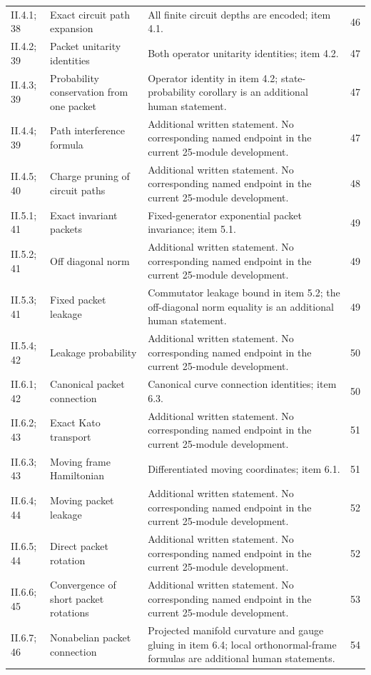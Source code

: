 {\begin{longtable}{@{}p{.13\linewidth}p{.31\linewidth}p{.42\linewidth}r@{}}
II.4.1; 38 & Exact circuit path expansion & All finite circuit depths are encoded; item 4.1. & 46\\
II.4.2; 39 & Packet unitarity identities & Both operator unitarity identities; item 4.2. & 47\\
II.4.3; 39 & Probability conservation from one packet & Operator identity in item 4.2; state-probability corollary is an additional human statement. & 47\\
II.4.4; 39 & Path interference formula & Additional written statement. No corresponding named endpoint in the current 25-module development. & 47\\
II.4.5; 40 & Charge pruning of circuit paths & Additional written statement. No corresponding named endpoint in the current 25-module development. & 48\\
II.5.1; 41 & Exact invariant packets & Fixed-generator exponential packet invariance; item 5.1. & 49\\
II.5.2; 41 & Off diagonal norm & Additional written statement. No corresponding named endpoint in the current 25-module development. & 49\\
II.5.3; 41 & Fixed packet leakage & Commutator leakage bound in item 5.2; the off-diagonal norm equality is an additional human statement. & 49\\
II.5.4; 42 & Leakage probability & Additional written statement. No corresponding named endpoint in the current 25-module development. & 50\\
II.6.1; 42 & Canonical packet connection & Canonical curve connection identities; item 6.3. & 50\\
II.6.2; 43 & Exact Kato transport & Additional written statement. No corresponding named endpoint in the current 25-module development. & 51\\
II.6.3; 43 & Moving frame Hamiltonian & Differentiated moving coordinates; item 6.1. & 51\\
II.6.4; 44 & Moving packet leakage & Additional written statement. No corresponding named endpoint in the current 25-module development. & 52\\
II.6.5; 44 & Direct packet rotation & Additional written statement. No corresponding named endpoint in the current 25-module development. & 52\\
II.6.6; 45 & Convergence of short packet rotations & Additional written statement. No corresponding named endpoint in the current 25-module development. & 53\\
II.6.7; 46 & Nonabelian packet connection & Projected manifold curvature and gauge gluing in item 6.4; local orthonormal-frame formulas are additional human statements. & 54\\

\end{longtable}}
